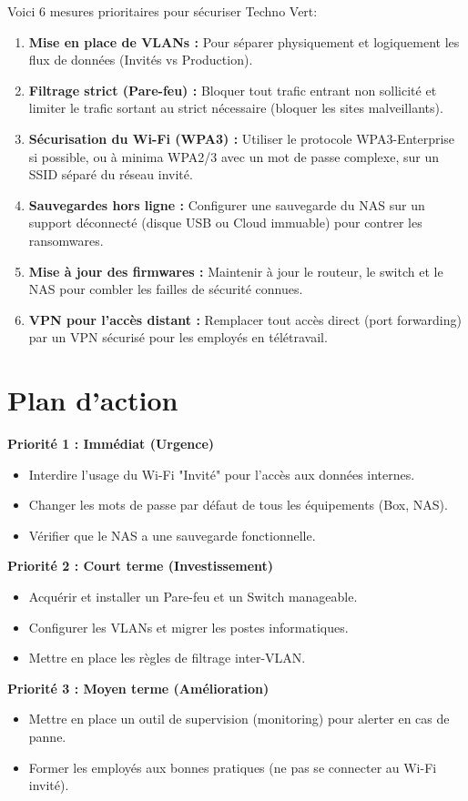 \documentclass[a4paper,12pt]{article}
\begin{document}
Voici 6 mesures prioritaires pour sécuriser Techno Vert:

\begin{enumerate}
    \item \textbf{Mise en place de VLANs :} Pour séparer physiquement et logiquement les flux de données (Invités vs Production).
    \item \textbf{Filtrage strict (Pare-feu) :} Bloquer tout trafic entrant non sollicité et limiter le trafic sortant au strict nécessaire (bloquer les sites malveillants).
    \item \textbf{Sécurisation du Wi-Fi (WPA3) :} Utiliser le protocole WPA3-Enterprise si possible, ou à minima WPA2/3 avec un mot de passe complexe, sur un SSID séparé du réseau invité.
    \item \textbf{Sauvegardes hors ligne :} Configurer une sauvegarde du NAS sur un support déconnecté (disque USB ou Cloud immuable) pour contrer les ransomwares.
    \item \textbf{Mise à jour des firmwares :} Maintenir à jour le routeur, le switch et le NAS pour combler les failles de sécurité connues.
    \item \textbf{VPN pour l'accès distant :} Remplacer tout accès direct (port forwarding) par un VPN sécurisé pour les employés en télétravail.
\end{enumerate}

\section{Plan d'action}

\textbf{Priorité 1 : Immédiat (Urgence)}
\begin{itemize}
    \item Interdire l'usage du Wi-Fi "Invité" pour l'accès aux données internes.
    \item Changer les mots de passe par défaut de tous les équipements (Box, NAS).
    \item Vérifier que le NAS a une sauvegarde fonctionnelle.
\end{itemize}

\textbf{Priorité 2 : Court terme (Investissement)}
\begin{itemize}
    \item Acquérir et installer un Pare-feu et un Switch manageable.
    \item Configurer les VLANs et migrer les postes informatiques.
    \item Mettre en place les règles de filtrage inter-VLAN.
\end{itemize}

\textbf{Priorité 3 : Moyen terme (Amélioration)}
\begin{itemize}
    \item Mettre en place un outil de supervision (monitoring) pour alerter en cas de panne.
    \item Former les employés aux bonnes pratiques (ne pas se connecter au Wi-Fi invité).
\end{itemize}
\end{document}
